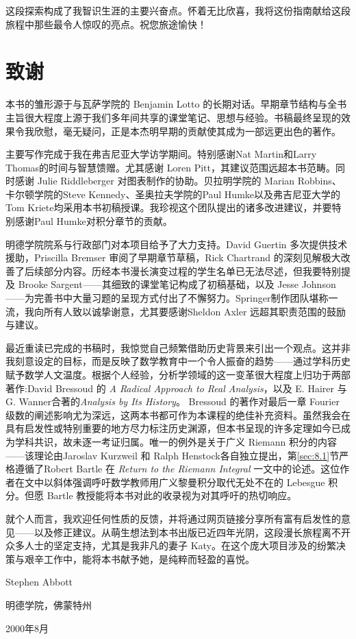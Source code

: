 这段探索构成了我智识生涯的主要兴奋点。怀着无比欣喜，我将这份指南献给这段旅程中那些最令人惊叹的亮点。祝您旅途愉快！

\section*{致谢}

本书的雏形源于与瓦萨学院的 Benjamin Lotto 的长期对话。早期章节结构与全书主旨很大程度上源于我们多年间共享的课堂笔记、思想与经验。书稿最终呈现的效果令我欣慰，毫无疑问，正是本杰明早期的贡献使其成为一部远更出色的著作。

主要写作完成于我在弗吉尼亚大学访学期间。特别感谢Nat Martin和Larry Thomas的时间与智慧馈赠。尤其感谢 Loren Pitt，其建议范围远超本书范畴。同时感谢 Julie Riddleberger 对图表制作的协助。贝拉明学院的 Marian Robbins、卡尔顿学院的Steve Kennedy、圣奥拉夫学院的Paul Humke以及弗吉尼亚大学的Tom Kriete均采用本书初稿授课。我珍视这个团队提出的诸多改进建议，并要特别感谢Paul Humke对积分章节的贡献。

明德学院院系与行政部门对本项目给予了大力支持。David Guertin 多次提供技术援助，Priscilla Bremser 审阅了早期章节草稿，Rick Chartrand 的深刻见解极大改善了后续部分内容。历经本书漫长演变过程的学生名单已无法尽述，但我要特别提及 Brooke Sargent——其细致的课堂笔记构成了初稿基础，以及 Jesse Johnson——为完善书中大量习题的呈现方式付出了不懈努力。Springer制作团队堪称一流，我向所有人致以诚挚谢意，尤其要感谢Sheldon Axler 远超其职责范围的鼓励与建议。

最近重读已完成的书稿时，我惊觉自己频繁借助历史背景来引出一个观点。这并非我刻意设定的目标，而是反映了数学教育中一个令人振奋的趋势——通过学科历史赋予数学人文温度。根据个人经验，分析学领域的这一变革很大程度上归功于两部著作:David Bressoud 的 \textit{A Radical Approach to Real Analysis}，以及 E. Hairer 与 G. Wanner合著的\textit{Analysis by Its History}。 Bressoud 的著作对最后一章 Fourier 级数的阐述影响尤为深远，这两本书都可作为本课程的绝佳补充资料。虽然我会在具有启发性或特别重要的地方尽力标注历史渊源，但本书呈现的许多定理如今已成为学科共识，故未逐一考证归属。唯一的例外是关于广义 Riemann 积分的内容——该理论由Jaroslav Kurzweil 和 Ralph Henstock各自独立提出，第\ref{sec:8.1}节严格遵循了Robert Bartle 在 \textit{Return to the Riemann Integral} 一文中的论述。这位作者在文中以斜体强调呼吁数学教师用广义黎曼积分取代无处不在的 Lebesgue 积分。但愿 Bartle 教授能将本书对此的收录视为对其呼吁的热切响应。

就个人而言，我欢迎任何性质的反馈，并将通过网页链接分享所有富有启发性的意见——以及修正建议。从萌生想法到本书出版已近四年光阴，这段漫长旅程离不开众多人士的坚定支持，尤其是我非凡的妻子 Katy。在这个庞大项目涉及的纷繁决策与艰辛工作中，能将本书献予她，是纯粹而轻盈的喜悦。

\begin{flushright}
Stephen Abbott
\end{flushright}
明德学院，佛蒙特州

2000年8月